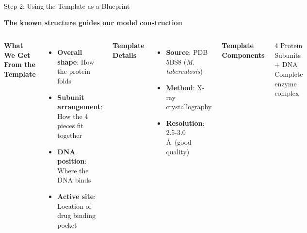 \documentclass[aspectratio=169,xcolor=table]{beamer}
\begin{document}
\begin{frame}{Step 2: Using the Template as a Blueprint}

\textbf{The known structure guides our model construction}

\vspace{0.3cm}

\begin{columns}
\textbf{What We Get From the Template}
\begin{itemize}
    \item \textbf{Overall shape}: How the protein folds
    \item \textbf{Subunit arrangement}: How the 4 pieces fit together
    \item \textbf{DNA position}: Where the DNA binds
    \item \textbf{Active site}: Location of drug binding pocket
\end{itemize}

\vspace{0.3cm}

\textbf{Template Details}
\begin{itemize}
    \item \textbf{Source}: PDB 5BS8 (\textit{M. tuberculosis})
    \item \textbf{Method}: X-ray crystallography
    \item \textbf{Resolution}: 2.5-3.0 \AA\ (good quality)
\end{itemize}

\begin{center}
\textbf{Template Components}
\vspace{0.2cm}

\end{center}

\vspace{0.2cm}

\begin{block}{4 Protein Subunits + DNA}
Complete enzyme complex
\end{block}
\end{columns}

\end{frame}
\end{document}
